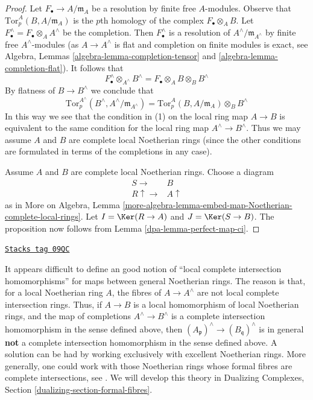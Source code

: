 \begin{proof}

Let $F_\bullet \to A/\mathfrak m_A$ be a resolution by finite
free $A$-modules. Observe that
$\text{Tor}^A_p(B, A/\mathfrak m_A)$
is the $p$th homology of the complex $F_\bullet \otimes_A B$.
Let $F_\bullet^\wedge = F_\bullet \otimes_A A^\wedge$ be the completion.
Then $F_\bullet^\wedge$ is a resolution of $A^\wedge/\mathfrak m_{A^\wedge}$
by finite free $A^\wedge$-modules (as $A \to A^\wedge$ is flat and completion
on finite modules is exact, see
Algebra, Lemmas \ref{algebra-lemma-completion-tensor} and
\ref{algebra-lemma-completion-flat}).
It follows that
$$
F_\bullet^\wedge \otimes_{A^\wedge} B^\wedge =
F_\bullet \otimes_A B \otimes_B B^\wedge
$$
By flatness of $B \to B^\wedge$ we conclude that
$$
\text{Tor}^{A^\wedge}_p(B^\wedge, A^\wedge/\mathfrak m_{A^\wedge}) =
\text{Tor}^A_p(B, A/\mathfrak m_A) \otimes_B B^\wedge
$$
In this way we see that the condition in (1) on the local ring map $A \to B$
is equivalent to the same condition for the local ring map
$A^\wedge \to B^\wedge$.
Thus we may assume $A$ and $B$ are complete local Noetherian rings
(since the other conditions are formulated in terms of the completions
in any case).

\medskip\noindent
Assume $A$ and $B$ are complete local Noetherian rings.
Choose a diagram
$$
\begin{array}{cc}S \longrightarrow & B \\ R \uparrow\longrightarrow & A \uparrow\end{array}
$$
as in More on Algebra, Lemma
\ref{more-algebra-lemma-embed-map-Noetherian-complete-local-rings}.
Let $I = \Ker(R \to A)$ and $J = \Ker(S \to B)$.
The proposition now follows from Lemma \ref{dpa-lemma-perfect-map-ci}.
\end{proof}

\begin{remark}
\label{dpa-remark-no-good-ci-map}
\href{https://stacks.math.columbia.edu/tag/09QC}{\texttt{Stacks tag 09QC}}

It appears difficult to define an good notion of ``local complete
intersection homomorphisms'' for maps between general Noetherian rings.
The reason is that, for a local Noetherian ring $A$, the fibres of
$A \to A^\wedge$ are not local complete intersection rings.
Thus, if $A \to B$ is a local homomorphism of local Noetherian rings,
and the map of completions $A^\wedge \to B^\wedge$ is a
complete intersection homomorphism in the sense defined above,
then $(A_\mathfrak p)^\wedge \to (B_\mathfrak q)^\wedge$ is in general
{\bf not} a complete intersection homomorphism in the sense
defined above. A solution can be had by working exclusively with
excellent Noetherian rings. More generally, one could work with
those Noetherian rings whose formal fibres are complete
intersections, see \cite{Rodicio-ci}.
We will develop this theory in
Dualizing Complexes, Section \ref{dualizing-section-formal-fibres}.
\end{remark}

